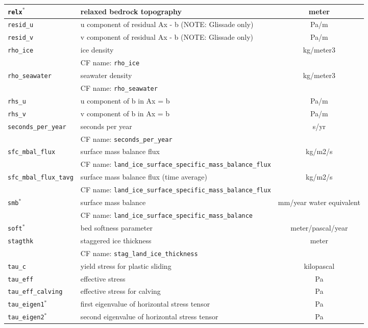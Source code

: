 \begin{center}
\begin{supertabular}{|l|p{8cm}|c|}
\hline
\texttt{relx}$^\ast$ & relaxed bedrock topography & meter\\
\hline
\texttt{resid\_u} & u component of residual Ax - b (NOTE: Glissade only) & Pa/m\\
\hline
\texttt{resid\_v} & v component of residual Ax - b (NOTE: Glissade only) & Pa/m\\
\hline
\texttt{rho\_ice} & ice density & kg/meter3\\
&CF name: \texttt{rho\_ice}&\\
\hline
\texttt{rho\_seawater} & seawater density & kg/meter3\\
&CF name: \texttt{rho\_seawater}&\\
\hline
\texttt{rhs\_u} & u component of b in Ax = b & Pa/m\\
\hline
\texttt{rhs\_v} & v component of b in Ax = b & Pa/m\\
\hline
\texttt{seconds\_per\_year} & seconds per year & s/yr\\
&CF name: \texttt{seconds\_per\_year}&\\
\hline
\texttt{sfc\_mbal\_flux} & surface mass balance flux & kg/m2/s\\
&CF name: \texttt{land\_ice\_surface\_specific\_mass\_balance\_flux}&\\
\hline
\texttt{sfc\_mbal\_flux\_tavg} & surface mass balance flux (time average) & kg/m2/s\\
&CF name: \texttt{land\_ice\_surface\_specific\_mass\_balance\_flux}&\\
\hline
\texttt{smb}$^\ast$ & surface mass balance & mm/year water equivalent\\
&CF name: \texttt{land\_ice\_surface\_specific\_mass\_balance}&\\
\hline
\texttt{soft}$^\ast$ & bed softness parameter & meter/pascal/year\\
\hline
\texttt{stagthk} & staggered ice thickness & meter\\
&CF name: \texttt{stag\_land\_ice\_thickness}&\\
\hline
\texttt{tau\_c} & yield stress for plastic sliding & kilopascal\\
\hline
\texttt{tau\_eff} & effective stress & Pa\\
\hline
\texttt{tau\_eff\_calving} & effective stress for calving & Pa\\
\hline
\texttt{tau\_eigen1}$^\ast$ & first eigenvalue of horizontal stress tensor & Pa\\
\hline
\texttt{tau\_eigen2}$^\ast$ & second eigenvalue of horizontal stress tensor & Pa\\

\end{supertabular}
\end{center}
